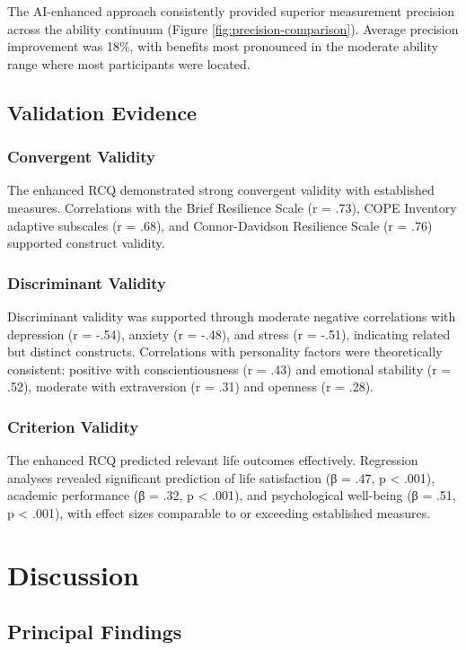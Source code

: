 \documentclass[12pt,a4paper]{article}
\begin{document}
The AI-enhanced approach consistently provided superior measurement precision across the ability continuum (Figure \ref{fig:precision-comparison}). Average precision improvement was 18\%, with benefits most pronounced in the moderate ability range where most participants were located.

\subsection{Validation Evidence}

\subsubsection{Convergent Validity}

The enhanced RCQ demonstrated strong convergent validity with established measures. Correlations with the Brief Resilience Scale (r = .73), COPE Inventory adaptive subscales (r = .68), and Connor-Davidson Resilience Scale (r = .76) supported construct validity.

\subsubsection{Discriminant Validity}

Discriminant validity was supported through moderate negative correlations with depression (r = -.54), anxiety (r = -.48), and stress (r = -.51), indicating related but distinct constructs. Correlations with personality factors were theoretically consistent: positive with conscientiousness (r = .43) and emotional stability (r = .52), moderate with extraversion (r = .31) and openness (r = .28).

\subsubsection{Criterion Validity}

The enhanced RCQ predicted relevant life outcomes effectively. Regression analyses revealed significant prediction of life satisfaction (β = .47, p < .001), academic performance (β = .32, p < .001), and psychological well-being (β = .51, p < .001), with effect sizes comparable to or exceeding established measures.

\section{Discussion}

\subsection{Principal Findings}
\end{document}
